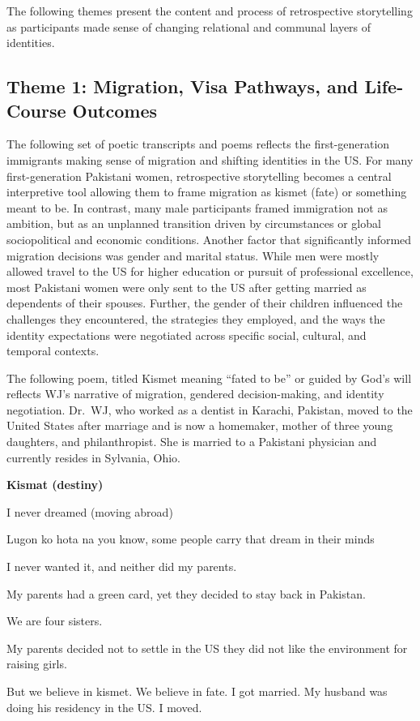 The following themes present the content and process of retrospective storytelling as participants made sense of changing relational and communal layers of identities.

\subsection{Theme 1: Migration, Visa Pathways, and Life-Course Outcomes}

The following set of poetic transcripts and poems reflects the first-generation immigrants making sense of migration and shifting identities in the US. For many first-generation Pakistani women, retrospective storytelling becomes a central interpretive tool allowing them to frame migration as kismet (fate) or something meant to be. In contrast, many male participants framed immigration not as ambition, but as an unplanned transition driven by circumstances or global sociopolitical and economic conditions. Another factor that significantly informed migration decisions was gender and marital status. While men were mostly allowed travel to the US for higher education or pursuit of professional excellence, most Pakistani women were only sent to the US after getting married as dependents of their spouses. Further, the gender of their children influenced the challenges they encountered, the strategies they employed, and the ways the identity expectations were negotiated across specific social, cultural, and temporal contexts.

The following poem, titled Kismet meaning ``fated to be'' or guided by God’s will reflects WJ’s narrative of migration, gendered decision-making, and identity negotiation. Dr.~WJ, who worked as a dentist in Karachi, Pakistan, moved to the United States after marriage and is now a homemaker, mother of three young daughters, and philanthropist. She is married to a Pakistani physician and currently resides in Sylvania, Ohio. 

\textbf{Kismat (destiny)}

\begin{FoundPoem}
    I never dreamed  
    (moving abroad)

    Lugon ko hota na
    you know,
    some people carry that dream
    in their minds

    I never wanted it,
    and neither did my parents.

    My parents had a green card,
    yet they decided
    to stay back in Pakistan.

    We are four sisters.

    My parents decided
    not to settle in the US
    they did not like the environment
    for raising girls.

    But we believe in kismet.
    We believe in fate.
    I got married.
    My husband was doing his residency
    in the US.
    I moved. 
\end{FoundPoem}


